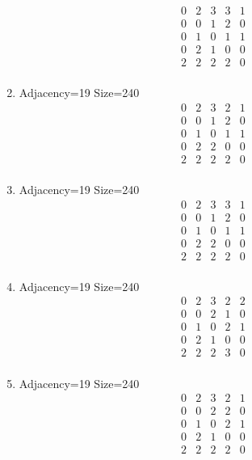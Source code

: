 \documentclass[12pt]{article}
\begin{document}
\begin{multicols}{3}
\begin{enumerate}
\begin{equation*}
\begin{array}{ccccc}
0&2&3&3&1\\
0&0&1&2&0\\
0&1&0&1&1\\
0&2&1&0&0\\
2&2&2&2&0\\
\end{array}
\end{equation*}
\item Adjacency=19 Size=240
\begin{equation*}
\begin{array}{ccccc}
0&2&3&2&1\\
0&0&1&2&0\\
0&1&0&1&1\\
0&2&2&0&0\\
2&2&2&2&0\\
\end{array}
\end{equation*}
\item Adjacency=19 Size=240
\begin{equation*}
\begin{array}{ccccc}
0&2&3&3&1\\
0&0&1&2&0\\
0&1&0&1&1\\
0&2&2&0&0\\
2&2&2&2&0\\
\end{array}
\end{equation*}
\item Adjacency=19 Size=240
\begin{equation*}
\begin{array}{ccccc}
0&2&3&2&2\\
0&0&2&1&0\\
0&1&0&2&1\\
0&2&1&0&0\\
2&2&2&3&0\\
\end{array}
\end{equation*}
\item Adjacency=19 Size=240
\begin{equation*}
\begin{array}{ccccc}
0&2&3&2&1\\
0&0&2&2&0\\
0&1&0&2&1\\
0&2&1&0&0\\
2&2&2&2&0\\
\end{array}

\end{equation*}
\end{enumerate}
\end{multicols}
\end{document}
